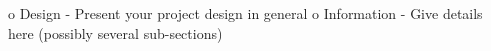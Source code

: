

o   Design - Present your project design in general
o   Information - Give details here (possibly several sub-sections)